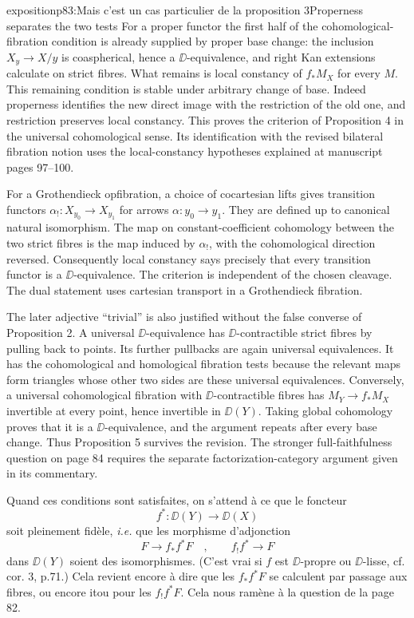 \begin{dcomment}{exposition}{p83:Mais c'est un cas particulier de la proposition 3}{Properness separates the two tests}
For a proper functor the first half of the cohomological-fibration condition is already supplied by proper base change: the inclusion $X_y\to X/y$ is coaspherical, hence a $\DD$-equivalence, and right Kan extensions calculate on strict fibres. What remains is local constancy of $f_*M_X$ for every $M$. This remaining condition is stable under arbitrary change of base. Indeed properness identifies the new direct image with the restriction of the old one, and restriction preserves local constancy. This proves the criterion of Proposition 4 in the universal cohomological sense. Its identification with the revised bilateral fibration notion uses the local-constancy hypotheses explained at manuscript pages 97--100.

For a Grothendieck opfibration, a choice of cocartesian lifts gives transition functors $\alpha_!:X_{y_0}\to X_{y_1}$ for arrows $\alpha:y_0\to y_1$. They are defined up to canonical natural isomorphism. The map on constant-coefficient cohomology between the two strict fibres is the map induced by $\alpha_!$, with the cohomological direction reversed. Consequently local constancy says precisely that every transition functor is a $\DD$-equivalence. The criterion is independent of the chosen cleavage. The dual statement uses cartesian transport in a Grothendieck fibration.

The later adjective ``trivial'' is also justified without the false converse of Proposition 2. A universal $\DD$-equivalence has $\DD$-contractible strict fibres by pulling back to points. Its further pullbacks are again universal equivalences. It has the cohomological and homological fibration tests because the relevant maps form triangles whose other two sides are these universal equivalences. Conversely, a universal cohomological fibration with $\DD$-contractible fibres has $M_Y\to f_*M_X$ invertible at every point, hence invertible in $\DD(Y)$. Taking global cohomology proves that it is a $\DD$-equivalence, and the argument repeats after every base change. Thus Proposition 5 survives the revision. The stronger full-faithfulness question on page 84 requires the separate factorization-category argument given in its commentary.
\end{dcomment}



Quand ces conditions sont satisfaites, on s'attend à ce que le foncteur
\[
f^* : \DD(Y) \longrightarrow \DD(X)
\]
soit pleinement fidèle, \textit{i.e.} que les morphisme d'adjonction %
\[
F \longrightarrow f_*f^*F \quad , \qquad f_!f^* \longrightarrow F %
\]
dans $\DD(Y)$ soient des isomorphismes. (C'est vrai si $f$ est $\DD$-propre ou $\DD$-lisse, cf. cor. 3, p.71.) Cela revient encore à dire que les $f_*f^*F$ se calculent par passage aux fibres, ou encore itou pour les $f_!f^*F$. Cela nous ramène à la question de la page 82.

